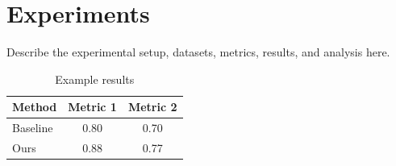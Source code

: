 \section{Experiments}

Describe the experimental setup, datasets, metrics, results, and analysis here.

\begin{table}[htbp]
  \centering
  \caption{Example results}
  \label{tab:example}
  \begin{tabular}{lcc}
    \toprule
    Method & Metric 1 & Metric 2 \\
    \midrule
    Baseline & 0.80 & 0.70 \\
    Ours & 0.88 & 0.77 \\
    \bottomrule
  \end{tabular}
\end{table}
